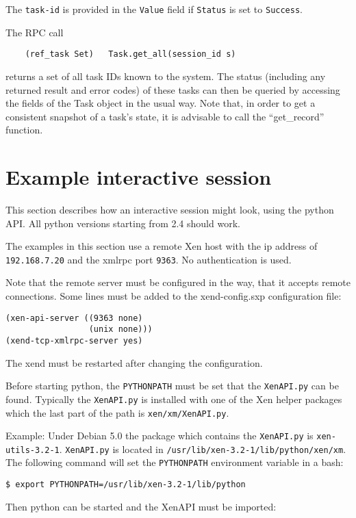 The {\tt task-id} is provided in the {\tt Value} field if {\tt Status} is set to
{\tt Success}.

The RPC call
\begin{verbatim}
    (ref_task Set)   Task.get_all(session_id s)
\end{verbatim} 
returns a set of all task IDs known to the system. The status (including any
returned result and error codes) of these tasks
can then be queried by accessing the fields of the Task object in the usual way. 
Note that, in order to get a consistent snapshot of a task's state, it is advisable to call the ``get\_record'' function.

\section{Example interactive session}
This section describes how an interactive session might look, using
the python API.  All python versions starting from 2.4 should work.

The examples in this section use a remote Xen host with the ip address
of \texttt{192.168.7.20} and the xmlrpc port \texttt{9363}.  No
authentication is used.

Note that the remote server must be configured in the way, that it
accepts remote connections.  Some lines must be added to the
xend-config.sxp configuration file:
\begin{verbatim}
(xen-api-server ((9363 none)
                 (unix none)))
(xend-tcp-xmlrpc-server yes)
\end{verbatim}
The xend must be restarted after changing the configuration.

Before starting python, the \texttt{PYTHONPATH} must be set that the
\texttt{XenAPI.py} can be found.  Typically the \texttt{XenAPI.py} is
installed with one of the Xen helper packages which the last part of
the path is \texttt{xen/xm/XenAPI.py}.

Example: Under Debian 5.0 the package which contains the
\texttt{XenAPI.py} is \texttt{xen-utils-3.2-1}. \texttt{XenAPI.py} is
located in \texttt{/usr/lib/xen-3.2-1/lib/python/xen/xm}. The
following command will set the \texttt{PYTHONPATH} environment
variable in a bash:

\begin{verbatim}
$ export PYTHONPATH=/usr/lib/xen-3.2-1/lib/python
\end{verbatim}

Then python can be started and the XenAPI must be imported:

